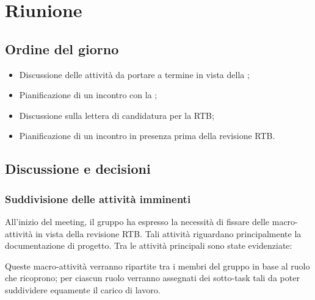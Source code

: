\section{Riunione}
\subsection{Ordine del giorno}
\begin{itemize}
	\item Discussione delle attività da portare a termine in vista della ;
	\item Pianificazione di un incontro con la ;
	\item Discussione sulla lettera di candidatura per la RTB;
	\item Pianificazione di un incontro in presenza prima della revisione RTB.
\end{itemize}

\subsection{Discussione e decisioni}
\subsubsection{Suddivisione delle attività imminenti}
\par All'inizio del meeting, il gruppo ha espresso la necessità di fissare delle macro-attività in vista della revisione RTB. Tali attività riguardano principalmente la documentazione di progetto. 
Tra le attività principali sono state evidenziate:
\par Queste macro-attività verranno ripartite tra i membri del gruppo in base al ruolo che ricoprono; per ciascun ruolo verranno assegnati dei sotto-task tali da poter suddividere equamente il carico di lavoro.

